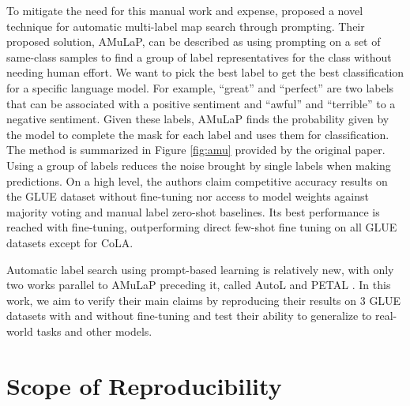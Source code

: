 \hfill \break
To mitigate the need for this manual work and expense, \citet{Wang} proposed a novel technique for automatic multi-label map search through prompting. Their proposed solution, AMuLaP, can be described as using prompting on a set of same-class samples to find a group of label representatives for the class without needing human effort. We want to pick the best label to get the best classification for a specific language model. For example, ``great'' and ``perfect'' are two labels that can be associated with a positive sentiment and ``awful'' and ``terrible'' to a negative sentiment. Given these labels, AMuLaP finds the probability given by the model to complete the mask for each label and uses them for classification. The method is summarized in Figure \ref{fig:amu} provided by the original paper. Using a group of labels reduces the noise brought by single labels when making predictions. On a high level, the authors claim competitive accuracy results on the GLUE dataset without fine-tuning nor access to model weights against majority voting and manual label zero-shot baselines. Its best performance is reached with fine-tuning, outperforming direct few-shot fine tuning on all GLUE datasets except for CoLA.

\hfill \break
Automatic label search using prompt-based learning is relatively new, with only two works parallel to AMuLaP preceding it, called AutoL \citep{gao-etal-2021-making} and PETAL \citep{schick-etal-2020-automatically}. In this work, we aim to verify their main claims by reproducing their results on 3 GLUE datasets with and without fine-tuning and test their ability to generalize to real-world tasks and other models.

\section{Scope of Reproducibility}




